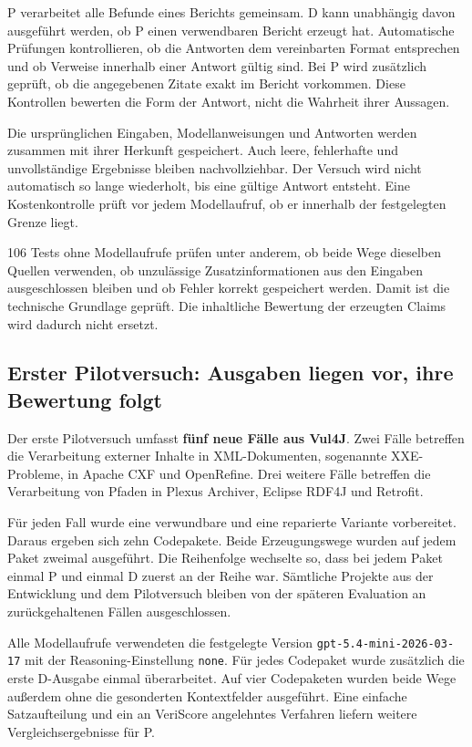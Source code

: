 \documentclass[10pt,a4paper]{article}
\begin{document}
P verarbeitet alle Befunde eines Berichts gemeinsam. D kann unabhängig davon ausgeführt werden, ob P einen verwendbaren Bericht erzeugt hat. Automatische Prüfungen kontrollieren, ob die Antworten dem vereinbarten Format entsprechen und ob Verweise innerhalb einer Antwort gültig sind. Bei P wird zusätzlich geprüft, ob die angegebenen Zitate exakt im Bericht vorkommen. Diese Kontrollen bewerten die Form der Antwort, nicht die Wahrheit ihrer Aussagen.

Die ursprünglichen Eingaben, Modellanweisungen und Antworten werden zusammen mit ihrer Herkunft gespeichert. Auch leere, fehlerhafte und unvollständige Ergebnisse bleiben nachvollziehbar. Der Versuch wird nicht automatisch so lange wiederholt, bis eine gültige Antwort entsteht. Eine Kostenkontrolle prüft vor jedem Modellaufruf, ob er innerhalb der festgelegten Grenze liegt.

106 Tests ohne Modellaufrufe prüfen unter anderem, ob beide Wege dieselben Quellen verwenden, ob unzulässige Zusatzinformationen aus den Eingaben ausgeschlossen bleiben und ob Fehler korrekt gespeichert werden. Damit ist die technische Grundlage geprüft. Die inhaltliche Bewertung der erzeugten Claims wird dadurch nicht ersetzt.

\newpage
\subsection{Erster Pilotversuch: Ausgaben liegen vor, ihre Bewertung folgt}
Der erste Pilotversuch umfasst \textbf{fünf neue Fälle aus Vul4J}. Zwei Fälle betreffen die Verarbeitung externer Inhalte in XML-Dokumenten, sogenannte XXE-Probleme, in Apache CXF und OpenRefine. Drei weitere Fälle betreffen die Verarbeitung von Pfaden in Plexus Archiver, Eclipse RDF4J und Retrofit.

Für jeden Fall wurde eine verwundbare und eine reparierte Variante vorbereitet. Daraus ergeben sich zehn Codepakete. Beide Erzeugungswege wurden auf jedem Paket zweimal ausgeführt. Die Reihenfolge wechselte so, dass bei jedem Paket einmal P und einmal D zuerst an der Reihe war. Sämtliche Projekte aus der Entwicklung und dem Pilotversuch bleiben von der späteren Evaluation an zurückgehaltenen Fällen ausgeschlossen.

Alle Modellaufrufe verwendeten die festgelegte Version \texttt{gpt-5.4-mini-2026-03-17} mit der Reasoning-Einstellung \texttt{none}. Für jedes Codepaket wurde zusätzlich die erste D-Ausgabe einmal überarbeitet. Auf vier Codepaketen wurden beide Wege au\ss{}erdem ohne die gesonderten Kontextfelder ausgeführt. Eine einfache Satzaufteilung und ein an VeriScore angelehntes Verfahren liefern weitere Vergleichsergebnisse für P.
\end{document}
